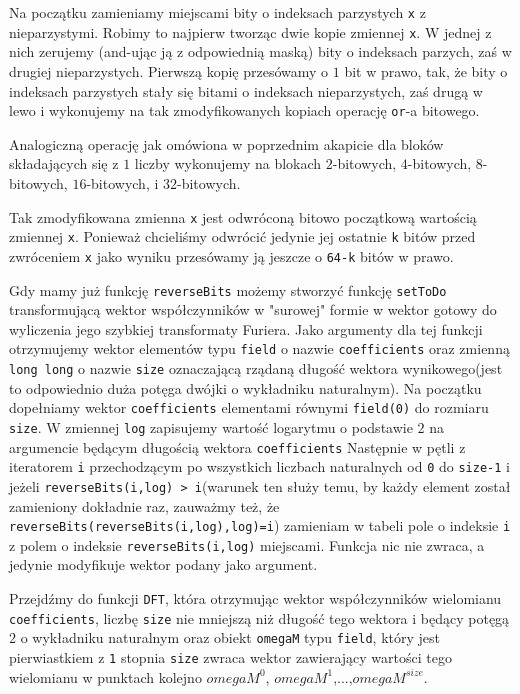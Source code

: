 \documentclass{article}
\begin{document}
Na początku zamieniamy miejscami bity o indeksach parzystych \texttt{x} z nieparzystymi.
Robimy to najpierw tworząc dwie kopie zmiennej \texttt{x}. W jednej z nich zerujemy 
(and-ując ją z odpowiednią maską) bity o indeksach parzych, zaś w drugiej nieparzystych.
Pierwszą kopię przesówamy o $1$ bit w prawo, tak, że bity o indeksach parzystych stały się bitami
o indeksach nieparzystych, zaś drugą w lewo i wykonujemy na tak zmodyfikowanych kopiach operację
\texttt{or}-a bitowego. 

Analogiczną operację jak omówiona w poprzednim akapicie dla bloków składających się z $1$ 
liczby wykonujemy na blokach $2$-bitowych, $4$-bitowych, $8$-bitowych, $16$-bitowych,
i $32$-bitowych. 

Tak zmodyfikowana zmienna \texttt{x} jest odwróconą bitowo początkową wartością zmiennej 
\texttt{x}. Ponieważ chcieliśmy odwrócić jedynie jej ostatnie \texttt{k} bitów przed 
zwróceniem \texttt{x} jako wyniku przesówamy ją jeszcze o \texttt{64-k} bitów w prawo.






Gdy mamy już funkcję \texttt{reverseBits} możemy stworzyć funkcję \texttt{setToDo} transformującą wektor współczynników w "surowej" formie w wektor gotowy
do wyliczenia jego szybkiej transformaty Furiera. Jako argumenty dla tej funkcji otrzymujemy wektor elementów typu \texttt{field} o nazwie \texttt{coefficients} oraz
zmienną \texttt{long long} o nazwie \texttt{size} oznaczającą rządaną długość wektora wynikowego(jest to odpowiednio duża potęga dwójki o wykładniku naturalnym). Na początku dopełniamy wektor 
\texttt{coefficients} elementami równymi \texttt{field(0)} do rozmiaru \texttt{size}. 
W zmiennej \texttt{log} zapisujemy wartość logarytmu o podstawie $2$ na argumencie będącym długością
wektora \texttt{coefficients}
Następnie w pętli z iteratorem \texttt{i} przechodzącym po wszystkich liczbach naturalnych od \texttt{0} do 
\texttt{size-1} i jeżeli \texttt{reverseBits(i,log) > i}(warunek ten służy temu, by każdy element został zamieniony dokładnie raz, zauważmy też, że \texttt{reverseBits(reverseBits(i,log),log)=i}) zamieniam w tabeli pole o indeksie \texttt{i} z polem o indeksie 
\texttt{reverseBits(i,log)} miejscami. Funkcja nic nie zwraca, a jedynie modyfikuje wektor podany jako argument.

Przejdźmy do funkcji \texttt{DFT}, która otrzymując wektor współczynników wielomianu \texttt{coefficients}, 
liczbę \texttt{size} nie mniejszą niż długość tego wektora i będący potęgą $2$ o wykładniku naturalnym oraz obiekt \texttt{omegaM} typu \texttt{field},
który jest pierwiastkiem z \texttt{1} stopnia \texttt{size} zwraca wektor zawierający wartości tego wielomianu w punktach kolejno $omegaM^0$, $omegaM^1$,...,$omegaM^{size}$. 
\end{document}
